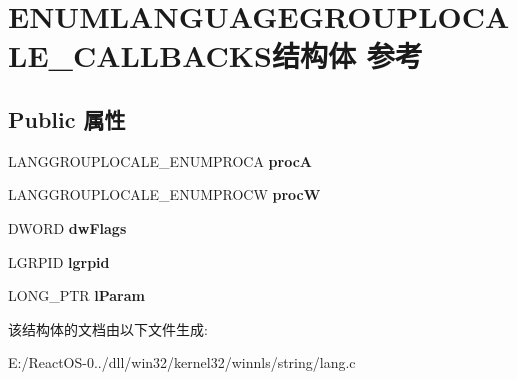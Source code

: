 \hypertarget{struct_e_n_u_m_l_a_n_g_u_a_g_e_g_r_o_u_p_l_o_c_a_l_e___c_a_l_l_b_a_c_k_s}{}\section{E\+N\+U\+M\+L\+A\+N\+G\+U\+A\+G\+E\+G\+R\+O\+U\+P\+L\+O\+C\+A\+L\+E\+\_\+\+C\+A\+L\+L\+B\+A\+C\+K\+S结构体 参考}
\label{struct_e_n_u_m_l_a_n_g_u_a_g_e_g_r_o_u_p_l_o_c_a_l_e___c_a_l_l_b_a_c_k_s}
\subsection*{Public 属性}
\begin{DoxyCompactItemize}
\item 
\mbox{\label{struct_e_n_u_m_l_a_n_g_u_a_g_e_g_r_o_u_p_l_o_c_a_l_e___c_a_l_l_b_a_c_k_s_af36463d66d1e0f8342abd43ef7a3b1e5}} 
L\+A\+N\+G\+G\+R\+O\+U\+P\+L\+O\+C\+A\+L\+E\+\_\+\+E\+N\+U\+M\+P\+R\+O\+CA {\bfseries procA}
\item 
\mbox{\label{struct_e_n_u_m_l_a_n_g_u_a_g_e_g_r_o_u_p_l_o_c_a_l_e___c_a_l_l_b_a_c_k_s_ae204e7228d7dc935bec2042d84ee5361}} 
L\+A\+N\+G\+G\+R\+O\+U\+P\+L\+O\+C\+A\+L\+E\+\_\+\+E\+N\+U\+M\+P\+R\+O\+CW {\bfseries procW}
\item 
\mbox{\label{struct_e_n_u_m_l_a_n_g_u_a_g_e_g_r_o_u_p_l_o_c_a_l_e___c_a_l_l_b_a_c_k_s_a661a90cab9439cdbf5b86564bad34a75}} 
D\+W\+O\+RD {\bfseries dw\+Flags}
\item 
\mbox{\label{struct_e_n_u_m_l_a_n_g_u_a_g_e_g_r_o_u_p_l_o_c_a_l_e___c_a_l_l_b_a_c_k_s_a4e6f77485db2081e52e1f21014afbd86}} 
L\+G\+R\+P\+ID {\bfseries lgrpid}
\item 
\mbox{\label{struct_e_n_u_m_l_a_n_g_u_a_g_e_g_r_o_u_p_l_o_c_a_l_e___c_a_l_l_b_a_c_k_s_a1b6d4635a6e9331d1903b3d007e04583}} 
L\+O\+N\+G\+\_\+\+P\+TR {\bfseries l\+Param}
\end{DoxyCompactItemize}


该结构体的文档由以下文件生成\+:\begin{DoxyCompactItemize}
\item 
E\+:/\+React\+O\+S-\/0../dll/win32/kernel32/winnls/string/lang.\+c\end{DoxyCompactItemize}
